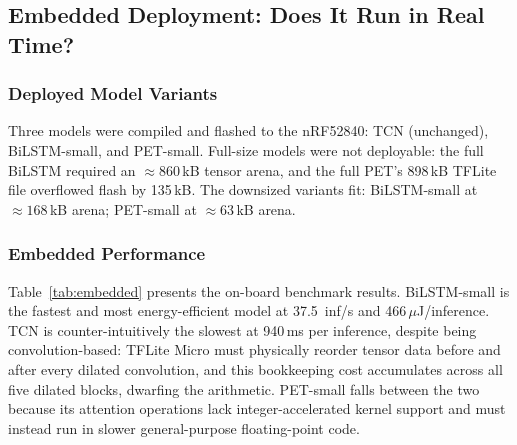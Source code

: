\documentclass[11pt]{article}
\begin{document}
\subsection{Embedded Deployment: Does It Run in Real Time?}
\label{sec:results_embedded}

\subsubsection{Deployed Model Variants}
\label{sec:model_improvement}

Three models were compiled and flashed to the nRF52840: TCN (unchanged), BiLSTM-small, and PET-small. Full-size models were not deployable: the full BiLSTM required an ${\approx}860$\,kB tensor arena, and the full PET's 898\,kB TFLite file overflowed flash by 135\,kB. The downsized variants fit: BiLSTM-small at ${\approx}168$\,kB arena; PET-small at ${\approx}63$\,kB arena.

\subsubsection{Embedded Performance}

Table~\ref{tab:embedded} presents the on-board benchmark results. BiLSTM-small is the fastest and most energy-efficient model at 37.5~inf/s and 466\,$\mu$J/inference. TCN is counter-intuitively the slowest at 940\,ms per inference, despite being convolution-based: TFLite Micro must physically reorder tensor data before and after every dilated convolution, and this bookkeeping cost accumulates across all five dilated blocks, dwarfing the arithmetic. PET-small falls between the two because its attention operations lack integer-accelerated kernel support and must instead run in slower general-purpose floating-point code.

\begin{table}[H]
\centering
\caption{On-device benchmark results on the nRF52840 DK (100 windows, NinaPro~DB1 S1). Throughput = $10^6/\overline{t}$; Energy = $\overline{t} \times 3.3\,\text{V} \times 5.3\,\text{mA}$.}
\label{tab:embedded}
\end{table}
\end{document}
